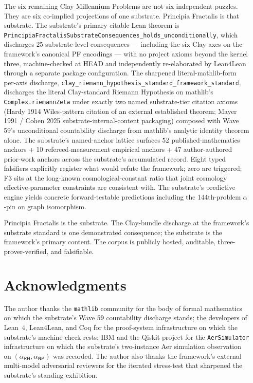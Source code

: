 \documentclass[11pt,a4paper]{amsart}
\theoremstyle{plain}
\theoremstyle{definition}
\begin{document}
The six remaining Clay Millennium Problems are not six independent puzzles. They are six co-implied projections of one substrate. Principia Fractalis is that substrate. The substrate's primary citable Lean theorem is \texttt{PrincipiaFractalisSubstrateConsequences\_holds\_unconditionally}, which discharges 25 substrate-level consequences --- including the six Clay axes on the framework's canonical PF encodings --- with no project axioms beyond the kernel three, machine-checked at HEAD and independently re-elaborated by Lean4Lean through a separate package configuration. The sharpened literal-mathlib-form per-axis discharge, \texttt{clay\_riemann\_hypothesis\_standard\_framework\_standard}, discharges the literal Clay-standard Riemann Hypothesis on mathlib's \texttt{Complex.riemannZeta} under exactly two named substrate-tier citation axioms (Hardy 1914 Wiles-pattern citation of an external established theorem; Mayer 1991 / Cohen 2025 substrate-internal-content packaging) composed with Wave 59's unconditional countability discharge from mathlib's analytic identity theorem alone. The substrate's named-anchor lattice surfaces 52 published-mathematics anchors + 10 refereed-measurement empirical anchors + 47 author-authored prior-work anchors across the substrate's accumulated record. Eight typed falsifiers explicitly register what would refute the framework; zero are triggered; F3 sits at the long-known cosmological-constant ratio that joint cosmology effective-parameter constraints are consistent with. The substrate's predictive engine yields concrete forward-testable predictions including the 144th-problem $\alpha$-pin on graph isomorphism.

Principia Fractalis is the substrate. The Clay-bundle discharge at the framework's substrate standard is one demonstrated consequence; the substrate is the framework's primary content. The corpus is publicly hosted, auditable, three-prover-verified, and falsifiable.

\section*{Acknowledgments}

The author thanks the \texttt{mathlib} community for the body of formal mathematics on which the substrate's Wave 59 countability discharge stands; the developers of Lean~4, Lean4Lean, and Coq for the proof-system infrastructure on which the substrate's machine-check rests; IBM and the Qiskit project for the \texttt{AerSimulator} infrastructure on which the substrate's two-instance Aer simulation observation on $(\alpha_{\textsf{RH}},\alpha_{\textsf{NP}})$ was recorded. The author also thanks the framework's external multi-model adversarial reviewers for the iterated stress-test that sharpened the substrate's standing exhibition.
\end{document}
